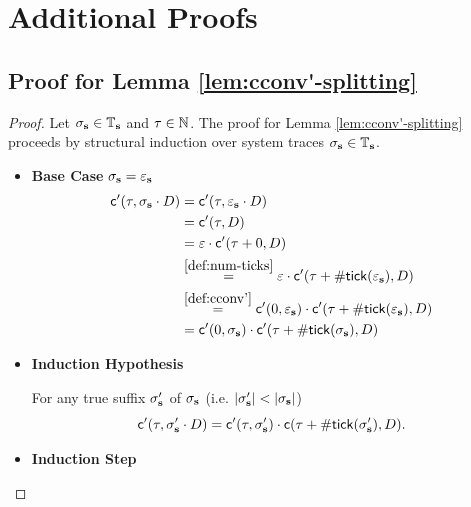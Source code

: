 \chapter{Additional Proofs}
\section{Proof for Lemma \ref{lem:cconv'-splitting}}
\label{appendix:section:proof-splitting-lemma}

\begin{proof}
    \label{proof:cconv'-splitting}
    Let $\sigma_{\mathbf{s}} \in \mathbb{T}_{\mathbf{s}}$ and $\tau \in \mathbb{N}$.
    The proof for Lemma \ref{lem:cconv'-splitting} proceeds
    by structural induction over system traces
    $\sigma_{\mathbf{s}} \in \mathbb{T}_{\mathbf{s}}$.
    \begin{itemize}
        \item \textbf{Base Case} $\sigma_{\mathbf{s}} = \varepsilon_{\mathbf{s}}$
        \begin{align*}
            \mathsf{c}'(\tau, \sigma_{\mathbf{s}} \cdot D)
            &=  \mathsf{c}'(\tau, \varepsilon_{\mathbf{s}} \cdot D) \\
            &=  \mathsf{c}'(\tau, D) \\
            &=  \varepsilon \cdot \mathsf{c}'(\tau + 0, D) \\
            &\stackrel{\ref{def:num-ticks}}{=} 
                \varepsilon \cdot
                \mathsf{c}'(\tau + \mathsf{\#tick}(\varepsilon_{\mathbf{s}}), D) \\
            &\stackrel{\ref{def:cconv'}}{=} 
                \mathsf{c}'(0, \varepsilon_{\mathbf{s}}) \cdot
                \mathsf{c}'(\tau + \mathsf{\#tick}(\varepsilon_{\mathbf{s}}), D) \\
            &= \mathsf{c}'(0, \sigma_{\mathbf{s}}) \cdot
                \mathsf{c}'(\tau + \mathsf{\#tick}(\sigma_{\mathbf{s}}), D)
        \end{align*}
        \item \textbf{Induction Hypothesis}

        For any true suffix $\sigma_{\mathbf{s}}'$ of $\sigma_{\mathbf{s}}$ 
        (i.e. $|\sigma_{\mathbf{s}}'| < |\sigma_{\mathbf{s}}|$)
        $$
        \mathsf{c}'(\tau, \sigma_{\mathbf{s}}' \cdot D)
        = \mathsf{c}'(\tau, \sigma_{\mathbf{s}}') \cdot
        \mathsf{c}(\tau + \mathsf{\#tick}(\sigma_{\mathbf{s}}'), D).
        $$

        \item \textbf{Induction Step}


\end{itemize}
\end{proof}
